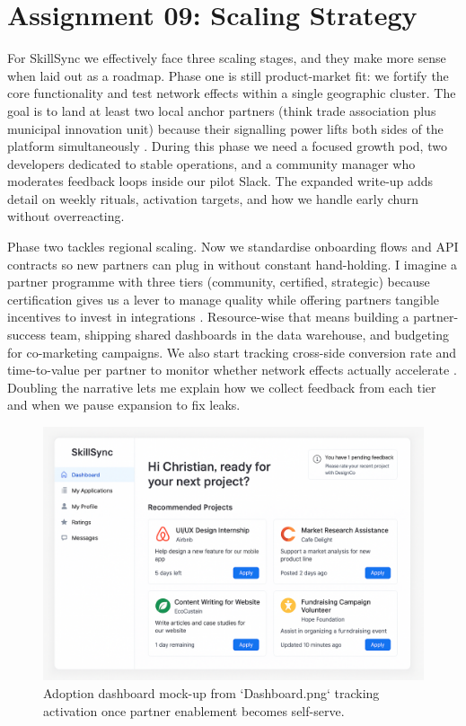 \section*{Assignment 09: Scaling Strategy}

For SkillSync we effectively face three scaling stages, and they make more sense when laid out as a roadmap. Phase one is still product-market fit: we fortify the core functionality and test network effects within a single geographic cluster. The goal is to land at least two local anchor partners (think trade association plus municipal innovation unit) because their signalling power lifts both sides of the platform simultaneously \citep{Choudary2016,Reillier2017}. During this phase we need a focused growth pod, two developers dedicated to stable operations, and a community manager who moderates feedback loops inside our pilot Slack. The expanded write-up adds detail on weekly rituals, activation targets, and how we handle early churn without overreacting.

Phase two tackles regional scaling. Now we standardise onboarding flows and API contracts so new partners can plug in without constant hand-holding. I imagine a partner programme with three tiers (community, certified, strategic) because certification gives us a lever to manage quality while offering partners tangible incentives to invest in integrations \citep{HagiuWright2013}. Resource-wise that means building a partner-success team, shipping shared dashboards in the data warehouse, and budgeting for co-marketing campaigns. We also start tracking cross-side conversion rate and time-to-value per partner to monitor whether network effects actually accelerate \citep{ShapiroVarian1999}. Doubling the narrative lets me explain how we collect feedback from each tier and when we pause expansion to fix leaks.

\begin{figure}[h]
  \centering
  \includegraphics[width=0.75\linewidth]{figures/Dashboard.png}
  \caption{Adoption dashboard mock-up from `Dashboard.png` tracking activation once partner enablement becomes self-serve.}
  \label{fig:scaling-dashboard}
\end{figure}

